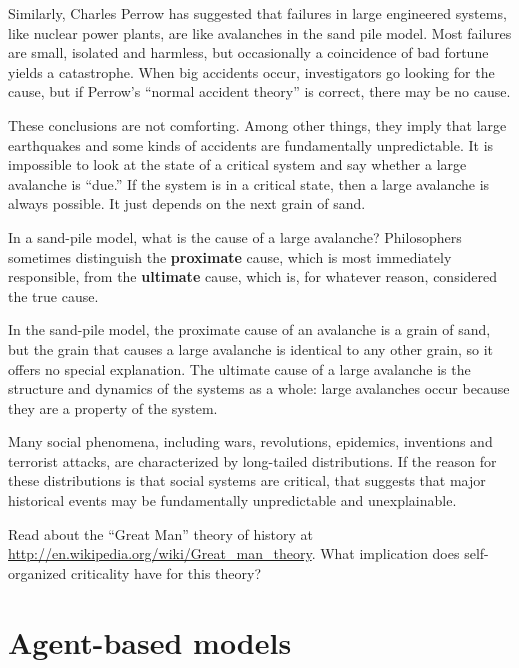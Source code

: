 \documentclass[10pt]{book}
\begin{document}
Similarly, Charles Perrow has suggested that failures in large
engineered systems, like nuclear power plants, are like avalanches
in the sand pile model.  Most failures are small, isolated and
harmless, but occasionally a coincidence of bad fortune yields a
catastrophe.  When big accidents occur, investigators go looking for
the cause, but if Perrow's ``normal accident theory'' is correct,
there may be no cause.

These conclusions are not comforting.  Among other things, they
imply that large earthquakes and some kinds of accidents are
fundamentally unpredictable.  It is impossible to look at the
state of a critical system and say whether a large avalanche
is ``due.''  If the system is in a critical state, then a large
avalanche is always possible.  It just depends on the
next grain of sand.

In a sand-pile model, what is the cause of a large avalanche?
Philosophers sometimes distinguish the {\bf proximate} cause, which is
most immediately responsible, from the {\bf ultimate} cause, which is,
for whatever reason, considered the true cause.

In the sand-pile model, the proximate cause of an avalanche is
a grain of sand, but the grain that causes a large avalanche
is identical to any other grain, so it offers no special explanation.
The ultimate cause of a large avalanche is the structure and
dynamics of the systems as a whole: large avalanches occur because
they are a property of the system.

Many social phenomena, including wars, revolutions, epidemics,
inventions and terrorist attacks, are characterized by long-tailed
distributions.  If the reason for these distributions is that
social systems are critical, that suggests that major historical
events may be fundamentally unpredictable and unexplainable.

\begin{exercise}

Read about the ``Great Man'' theory of history at
\url{http://en.wikipedia.org/wiki/Great_man_theory}.  What implication
does self-organized criticality have for this theory?

\end{exercise}


\chapter{Agent-based models}
\label{agent-based}
\end{document}
